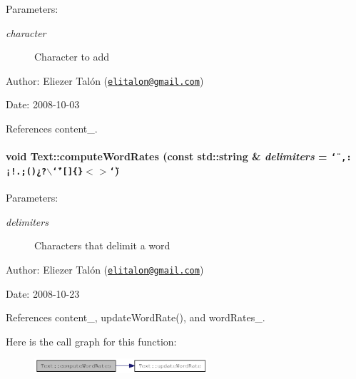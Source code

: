 \begin{Desc}
\item[Parameters:]
\begin{description}
\item[{\em character}]Character to add\end{description}
\end{Desc}
\begin{Desc}
\item[Author:]Eliezer Talón (\href{mailto:elitalon@gmail.com}{\tt elitalon@gmail.com}) \end{Desc}
\begin{Desc}
\item[Date:]2008-10-03 \end{Desc}


References content\_\-.\hypertarget{class_text_e954a35628c72537e2ee5ca6e9609ac1}{
\paragraph[{computeWordRates}]{\setlength{\rightskip}{0pt plus 5cm}void Text::computeWordRates (const std::string \& {\em delimiters} = {\tt \char`\"{}~,:¡!.;()¿?$\backslash$\char`\"{}'\mbox{[}\mbox{]}\{\}$<$$>$\char`\"{}})}\hfill}
\label{class_text_e954a35628c72537e2ee5ca6e9609ac1}


\begin{Desc}
\item[Parameters:]
\begin{description}
\item[{\em delimiters}]Characters that delimit a word\end{description}
\end{Desc}
\begin{Desc}
\item[Author:]Eliezer Talón (\href{mailto:elitalon@gmail.com}{\tt elitalon@gmail.com}) \end{Desc}
\begin{Desc}
\item[Date:]2008-10-23 \end{Desc}


References content\_\-, updateWordRate(), and wordRates\_\-.

Here is the call graph for this function:\nopagebreak
\begin{figure}[H]
\begin{center}
\leavevmode
\includegraphics[width=182pt]{class_text_e954a35628c72537e2ee5ca6e9609ac1_cgraph}
\end{center}
\end{figure}


